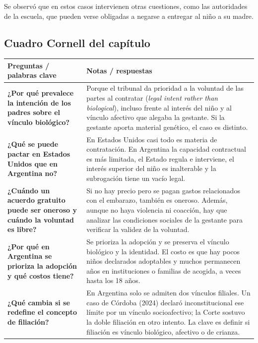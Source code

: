 \documentclass[12pt,oneside]{book}
\begin{document}
Se observó que en estos casos intervienen otras cuestiones, como las autoridades de la escuela, que pueden verse obligadas a negarse a entregar al niño a su madre.

\subsection*{Cuadro Cornell del capítulo}

\begin{table}[H]
\centering
\begin{tabularx}{\textwidth}{
    >{\raggedright\arraybackslash}p{}
    >{\raggedright\arraybackslash}X
}
\toprule
\textbf{Preguntas / palabras clave} &
\textbf{Notas / respuestas} \\
\midrule

\textbf{¿Por qué prevalece la intención de los padres sobre el vínculo biológico?} &
Porque el tribunal da prioridad a la voluntad de las partes al contratar (\textit{legal intent rather than biological}), incluso frente al interés del niño y al vínculo afectivo que alegaba la gestante. Si la gestante aporta material genético, el caso es distinto. \\

\textbf{¿Qué se puede pactar en Estados Unidos que en Argentina no?} &
En Estados Unidos casi todo es materia de contratación. En Argentina la capacidad contractual es más limitada, el Estado regula e interviene, el interés superior del niño es inalterable y la subrogación tiene un vacío legal. \\

\textbf{¿Cuándo un acuerdo gratuito puede ser oneroso y cuándo la voluntad es libre?} &
Si no hay precio pero se pagan gastos relacionados con el embarazo, también es oneroso. Además, aunque no haya violencia ni coacción, hay que analizar las condiciones sociales de la gestante para verificar la validez de la voluntad. \\

\textbf{¿Por qué en Argentina se prioriza la adopción y qué costos tiene?} &
Se prioriza la adopción y se preserva el vínculo biológico y la identidad. El costo es que hay pocos niños declarados adoptables y muchos permanecen años en instituciones o familias de acogida, a veces hasta los 18 años. \\

\textbf{¿Qué cambia si se redefine el concepto de filiación?} &
En Argentina solo se admiten dos vínculos filiales. Un caso de Córdoba (2024) declaró inconstitucional ese límite por un vínculo socioafectivo; la Corte sostuvo la doble filiación en otro intento. La clave es definir si filiación es vínculo biológico, afectivo o de crianza. \\


\end{tabularx}
\end{table}
\end{document}
